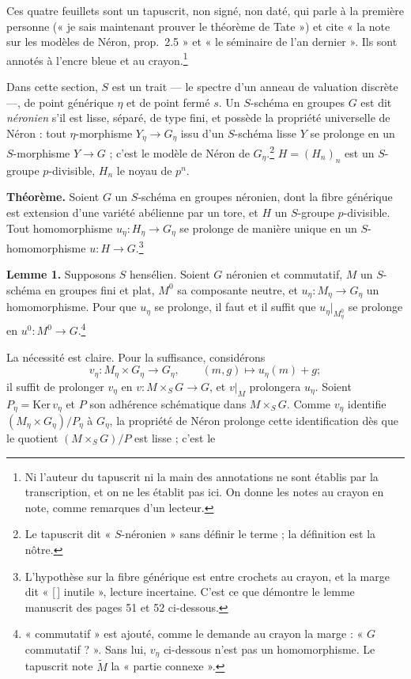 \documentclass[11pt,a4paper]{article}
\begin{document}
Ces quatre feuillets sont un tapuscrit, non signé, non daté, qui parle à la
première personne (« je sais maintenant prouver le théorème de Tate ») et cite
« la note sur les modèles de Néron, prop.\ 2.5 » et « le séminaire de l'an
dernier ». Ils sont annotés à l'encre bleue et au crayon.\footnote{Ni l'auteur
du tapuscrit ni la main des annotations ne sont établis par la transcription,
et on ne les établit pas ici. On donne les notes au crayon en note, comme
remarques d'un lecteur.}

Dans cette section, $S$ est un trait --- le spectre d'un anneau de valuation
discrète ---, de point générique $\eta$ et de point fermé $s$. Un $S$-schéma
en groupes $G$ est dit \emph{néronien} s'il est lisse, séparé, de type fini, et
possède la propriété universelle de Néron : tout $\eta$-morphisme
$Y_\eta \to G_\eta$ issu d'un $S$-schéma lisse $Y$ se prolonge en un
$S$-morphisme $Y \to G$ ; c'est le modèle de Néron de $G_\eta$.\footnote{Le
tapuscrit dit « $S$-néronien » sans définir le terme ; la définition est la
nôtre.} $H = (H_n)_n$ est un $S$-groupe $p$-divisible, $H_n$ le noyau de
$p^n$.

\textbf{Théorème.} Soient $G$ un $S$-schéma en groupes néronien, dont la fibre
générique est extension d'une variété abélienne par un tore, et $H$ un
$S$-groupe $p$-divisible. Tout homomorphisme $u_\eta : H_\eta \to G_\eta$ se
prolonge de manière unique en un $S$-homomorphisme $u : H \to
G$.\footnote{L'hypothèse sur la fibre générique est entre crochets au crayon,
et la marge dit « [\,] inutile », lecture incertaine. C'est ce que démontre
le lemme manuscrit des pages 51 et 52 ci-dessous.}

\textbf{Lemme 1.} Supposons $S$ hensélien. Soient $G$ néronien et commutatif,
$M$ un $S$-schéma en groupes fini et plat, $M^0$ sa composante neutre, et
$u_\eta : M_\eta \to G_\eta$ un homomorphisme. Pour que $u_\eta$ se prolonge,
il faut et il suffit que $u_\eta|_{M^0_\eta}$ se prolonge en
$u^0 : M^0 \to G$.\footnote{« commutatif » est ajouté, comme le demande au
crayon la marge : « $G$ commutatif ? ». Sans lui, $v_\eta$ ci-dessous n'est pas
un homomorphisme. Le tapuscrit note $\widetilde M$ la « partie connexe ».}

La nécessité est claire. Pour la suffisance, considérons
\[
  v_\eta : M_\eta \times G_\eta \longrightarrow G_\eta, \qquad (m, g)
  \longmapsto u_\eta(m) + g ;
\]
il suffit de prolonger $v_\eta$ en $v : M \times_S G \to G$, et $v|_M$
prolongera $u_\eta$. Soient $P_\eta = \mathrm{Ker}\,v_\eta$ et $P$ son
adhérence schématique dans $M \times_S G$. Comme $v_\eta$ identifie
$(M_\eta \times G_\eta)/P_\eta$ à $G_\eta$, la propriété de Néron prolonge
cette identification dès que le quotient $(M \times_S G)/P$ est lisse ; c'est
le
\end{document}
